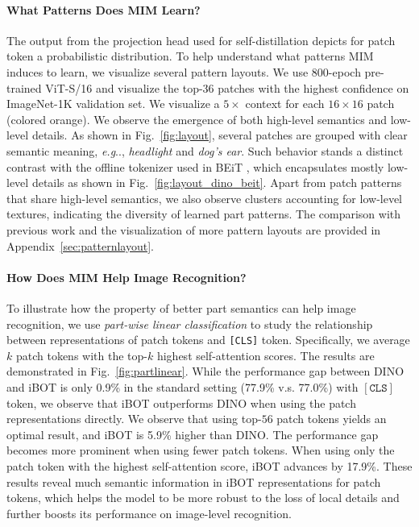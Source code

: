 \documentclass{article} %
\makeatletter
\def\ourmethod{{iBOT}\xspace}
\DeclareRobustCommand\onedot{\futurelet\@let@token\@onedot}
\def\@onedot{\ifx\@let@token.\else.\null\fi\xspace}
\def\eg{\emph{e.g}\onedot} \def\Eg{\emph{E.g}\onedot}
\makeatother
\begin{document}
\paragraph{What Patterns Does MIM Learn?} 
The output from the projection head used for self-distillation depicts for patch token a probabilistic distribution.
To help understand what patterns MIM induces to learn, we visualize several pattern layouts. 
We use $800$-epoch pre-trained ViT-S/16 and visualize the top-$36$ patches with the highest confidence on ImageNet-1K validation set. We visualize a $5\times$ context for each $16\times16$ patch (colored orange). 
We observe the emergence of both high-level semantics and low-level details.
As shown in Fig.~\ref{fig:layout}, several patches are grouped with clear semantic meaning, \eg, \textit{headlight} and \textit{dog's ear}. 
Such behavior stands a distinct contrast with the offline tokenizer used in BEiT \citep{beit}, which encapsulates mostly low-level details as shown in Fig.~\ref{fig:layout_dino_beit}. 
Apart from patch patterns that share high-level semantics, we also observe clusters accounting for low-level textures, indicating the diversity of learned part patterns. 
The comparison with previous work \citep{dino, beit} and the visualization of more pattern layouts are provided in Appendix~\ref{sec:patternlayout}.

\paragraph{How Does MIM Help Image Recognition?} 
To illustrate how the property of better part semantics can help image recognition, we use \textit{part-wise linear classification} to study the relationship between representations of patch tokens and \texttt{[CLS]} token. Specifically, we average $k$ patch tokens with the top-$k$ highest self-attention scores. 
The results are demonstrated in Fig.~\ref{fig:partlinear}. 
While the performance gap between DINO and \ourmethod is only 0.9\% in the standard setting (77.9\% v.s. 77.0\%) with $[\texttt{CLS}]$ token, we observe that \ourmethod outperforms DINO when using the patch representations directly.
We observe that using top-$56$ patch tokens yields an optimal result, and \ourmethod is 5.9\% higher than DINO. 
The performance gap becomes more prominent when using fewer patch tokens. When using only the patch token with the highest self-attention score, \ourmethod advances by 17.9\%. 
These results reveal much semantic information in \ourmethod representations for patch tokens, which helps the model to be more robust to the loss of local details and further boosts its performance on image-level recognition.
\end{document}
